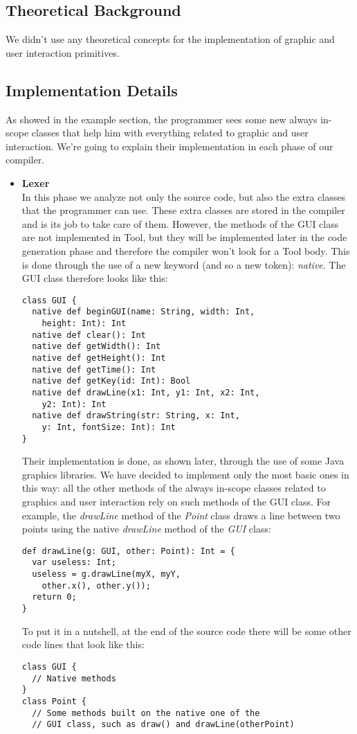 \subsection{Theoretical Background}
We didn't use any theoretical concepts for the implementation of graphic and user interaction primitives.

\subsection{Implementation Details}
As showed in the example section, the programmer sees some new always in-scope classes that help him with everything related to graphic and user interaction.
We're going to explain their implementation in each phase of our compiler.
\begin{itemize}
\item{\textbf{Lexer}} \hfill \\
In this phase we analyze not only the source code, but also the extra classes that the programmer can use.
These extra classes are stored in the compiler and is its job to take care of them.
However, the methods of the GUI class are not implemented in Tool, but they will be implemented later in the code generation phase and therefore the compiler won't look for a Tool body.
This is done through the use of a new keyword (and so a new token): \textit{native}.
The GUI class therefore looks like this:
\begin{lstlisting}
class GUI {
  native def beginGUI(name: String, width: Int,
    height: Int): Int
  native def clear(): Int
  native def getWidth(): Int
  native def getHeight(): Int
  native def getTime(): Int
  native def getKey(id: Int): Bool
  native def drawLine(x1: Int, y1: Int, x2: Int,
    y2: Int): Int
  native def drawString(str: String, x: Int,
    y: Int, fontSize: Int): Int
}
\end{lstlisting}
Their implementation is done, as shown later, through the use of some Java graphics libraries.
We have decided to implement only the most basic ones in this way: all the other methods of the always in-scope classes related to graphics and user interaction rely on such methods of the GUI class.
For example, the \textit{drawLine} method of the \textit{Point} class draws a line between two points using the native \textit{drawLine} method of the \textit{GUI} class:
\begin{lstlisting}
def drawLine(g: GUI, other: Point): Int = {
  var useless: Int;
  useless = g.drawLine(myX, myY,
    other.x(), other.y());
  return 0;
}
\end{lstlisting}
To put it in a nutshell, at the end of the source code there will be some other code lines that look like this:
\begin{lstlisting}
class GUI {
  // Native methods
}
class Point {
  // Some methods built on the native one of the
  // GUI class, such as draw() and drawLine(otherPoint)
  

\end{lstlisting}
\end{itemize}
